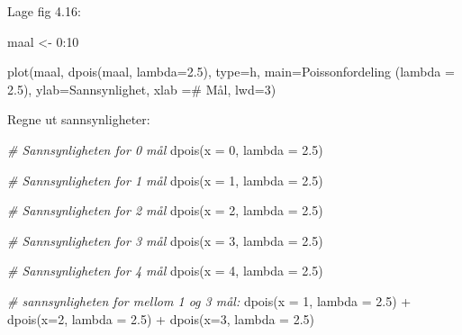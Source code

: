 \documentclass[
]{book}
\newenvironment{Shaded}{\begin{snugshade}}{\end{snugshade}}
\newcommand{\AttributeTok}[1]{\textcolor[rgb]{0.77,0.63,0.00}{#1}}
\newcommand{\CommentTok}[1]{\textcolor[rgb]{0.56,0.35,0.01}{\textit{#1}}}
\newcommand{\DecValTok}[1]{\textcolor[rgb]{0.00,0.00,0.81}{#1}}
\newcommand{\FloatTok}[1]{\textcolor[rgb]{0.00,0.00,0.81}{#1}}
\newcommand{\FunctionTok}[1]{\textcolor[rgb]{0.00,0.00,0.00}{#1}}
\newcommand{\NormalTok}[1]{#1}
\newcommand{\OtherTok}[1]{\textcolor[rgb]{0.56,0.35,0.01}{#1}}
\newcommand{\SpecialCharTok}[1]{\textcolor[rgb]{0.00,0.00,0.00}{#1}}
\newcommand{\StringTok}[1]{\textcolor[rgb]{0.31,0.60,0.02}{#1}}
\begin{document}
Lage fig 4.16:

\begin{Shaded}
\begin{Highlighting}[]
\NormalTok{maal }\OtherTok{\textless{}{-}} \DecValTok{0}\SpecialCharTok{:}\DecValTok{10}

\FunctionTok{plot}\NormalTok{(maal, }\FunctionTok{dpois}\NormalTok{(maal, }\AttributeTok{lambda=}\FloatTok{2.5}\NormalTok{),}
     \AttributeTok{type=}\StringTok{\textquotesingle{}h\textquotesingle{}}\NormalTok{,}
     \AttributeTok{main=}\StringTok{\textquotesingle{}Poissonfordeling (lambda = 2.5)\textquotesingle{}}\NormalTok{,}
     \AttributeTok{ylab=}\StringTok{\textquotesingle{}Sannsynlighet\textquotesingle{}}\NormalTok{,}
     \AttributeTok{xlab =}\StringTok{\textquotesingle{}\# Mål\textquotesingle{}}\NormalTok{,}
     \AttributeTok{lwd=}\DecValTok{3}\NormalTok{)}
\end{Highlighting}
\end{Shaded}

Regne ut sannsynligheter:

\begin{Shaded}
\begin{Highlighting}[]
\CommentTok{\# Sannsynligheten for 0 mål}
\FunctionTok{dpois}\NormalTok{(}\AttributeTok{x =} \DecValTok{0}\NormalTok{, }\AttributeTok{lambda =} \FloatTok{2.5}\NormalTok{)}

\CommentTok{\# Sannsynligheten for 1 mål}
\FunctionTok{dpois}\NormalTok{(}\AttributeTok{x =} \DecValTok{1}\NormalTok{, }\AttributeTok{lambda =} \FloatTok{2.5}\NormalTok{)}
      
\CommentTok{\# Sannsynligheten for 2 mål}
\FunctionTok{dpois}\NormalTok{(}\AttributeTok{x =} \DecValTok{2}\NormalTok{, }\AttributeTok{lambda =} \FloatTok{2.5}\NormalTok{)}
      
\CommentTok{\# Sannsynligheten for 3 mål}
\FunctionTok{dpois}\NormalTok{(}\AttributeTok{x =} \DecValTok{3}\NormalTok{, }\AttributeTok{lambda =} \FloatTok{2.5}\NormalTok{)}
      
\CommentTok{\# Sannsynligheten for 4 mål}
\FunctionTok{dpois}\NormalTok{(}\AttributeTok{x =} \DecValTok{4}\NormalTok{, }\AttributeTok{lambda =} \FloatTok{2.5}\NormalTok{)}
      
\CommentTok{\# sannsynligheten for mellom 1 og 3 mål:}
\FunctionTok{dpois}\NormalTok{(}\AttributeTok{x =} \DecValTok{1}\NormalTok{, }\AttributeTok{lambda =} \FloatTok{2.5}\NormalTok{) }\SpecialCharTok{+} \FunctionTok{dpois}\NormalTok{(}\AttributeTok{x=}\DecValTok{2}\NormalTok{, }\AttributeTok{lambda =} \FloatTok{2.5}\NormalTok{) }\SpecialCharTok{+} \FunctionTok{dpois}\NormalTok{(}\AttributeTok{x=}\DecValTok{3}\NormalTok{, }\AttributeTok{lambda =} \FloatTok{2.5}\NormalTok{)}
\end{Highlighting}
\end{Shaded}
\end{document}
